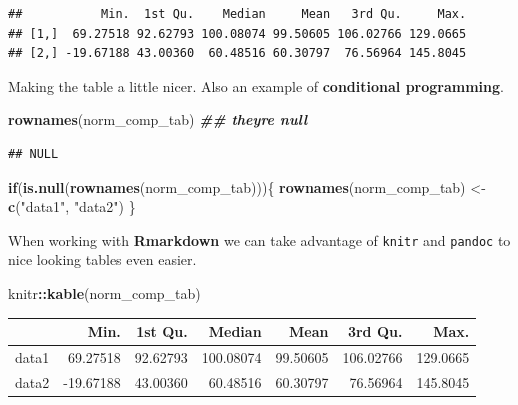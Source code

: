 \documentclass[
]{book}
\newenvironment{Shaded}{\begin{snugshade}}{\end{snugshade}}
\newcommand{\ControlFlowTok}[1]{\textcolor[rgb]{0.13,0.29,0.53}{\textbf{#1}}}
\newcommand{\DocumentationTok}[1]{\textcolor[rgb]{0.56,0.35,0.01}{\textbf{\textit{#1}}}}
\newcommand{\FunctionTok}[1]{\textcolor[rgb]{0.13,0.29,0.53}{\textbf{#1}}}
\newcommand{\NormalTok}[1]{#1}
\newcommand{\OtherTok}[1]{\textcolor[rgb]{0.56,0.35,0.01}{#1}}
\newcommand{\SpecialCharTok}[1]{\textcolor[rgb]{0.81,0.36,0.00}{\textbf{#1}}}
\newcommand{\StringTok}[1]{\textcolor[rgb]{0.31,0.60,0.02}{#1}}
\begin{document}
\begin{verbatim}
##           Min.  1st Qu.    Median     Mean   3rd Qu.     Max.
## [1,]  69.27518 92.62793 100.08074 99.50605 106.02766 129.0665
## [2,] -19.67188 43.00360  60.48516 60.30797  76.56964 145.8045
\end{verbatim}

Making the table a little nicer. Also an example of \textbf{conditional programming}.

\begin{Shaded}
\begin{Highlighting}[]
\FunctionTok{rownames}\NormalTok{(norm\_comp\_tab) }\DocumentationTok{\#\# they\textquotesingle{}re null}
\end{Highlighting}
\end{Shaded}

\begin{verbatim}
## NULL
\end{verbatim}

\begin{Shaded}
\begin{Highlighting}[]
\ControlFlowTok{if}\NormalTok{(}\FunctionTok{is.null}\NormalTok{(}\FunctionTok{rownames}\NormalTok{(norm\_comp\_tab)))\{}
  \FunctionTok{rownames}\NormalTok{(norm\_comp\_tab) }\OtherTok{\textless{}{-}} \FunctionTok{c}\NormalTok{(}\StringTok{"data1"}\NormalTok{, }\StringTok{"data2"}\NormalTok{)}
\NormalTok{\}}
\end{Highlighting}
\end{Shaded}

When working with \textbf{Rmarkdown} we can take advantage of \texttt{knitr} and \texttt{pandoc} to nice looking tables even easier.

\begin{Shaded}
\begin{Highlighting}[]
\NormalTok{knitr}\SpecialCharTok{::}\FunctionTok{kable}\NormalTok{(norm\_comp\_tab)}
\end{Highlighting}
\end{Shaded}

\begin{tabular}{l|r|r|r|r|r|r}
\hline
  & Min. & 1st Qu. & Median & Mean & 3rd Qu. & Max.\\
\hline
data1 & 69.27518 & 92.62793 & 100.08074 & 99.50605 & 106.02766 & 129.0665\\
\hline
data2 & -19.67188 & 43.00360 & 60.48516 & 60.30797 & 76.56964 & 145.8045\\
\hline
\end{tabular}
\end{document}
